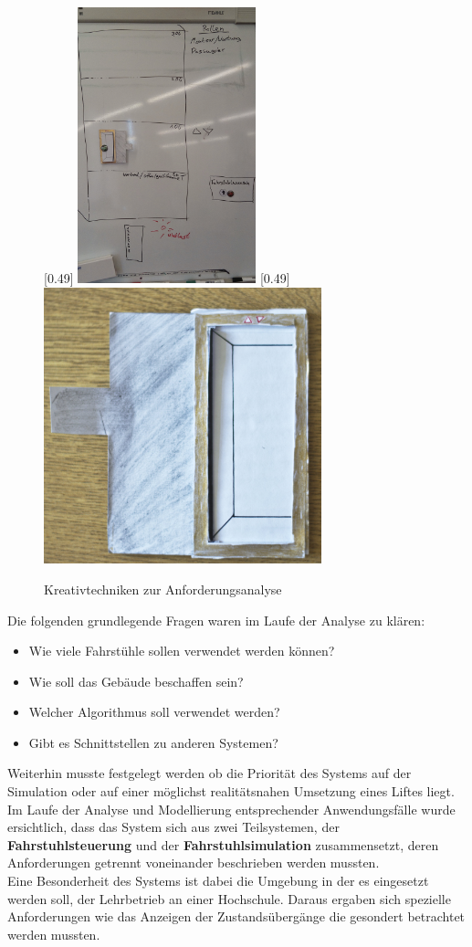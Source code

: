 \begin{figure}[hbt]
\centering
{}[0.49\linewidth]
{\includegraphics[height=8cm]{images/kundengespraech1.jpg}}
[0.49\linewidth]
{\includegraphics[height=8cm]{images/pappfahrstuhl.jpg}}
\caption{Kreativtechniken zur Anforderungsanalyse}
\end{figure}
Die folgenden grundlegende Fragen waren im Laufe der Analyse zu klären:
\begin{itemize}
	\item Wie viele Fahrstühle sollen verwendet werden können?
	\item Wie soll das Gebäude beschaffen sein?
	\item Welcher Algorithmus soll verwendet werden?
	\item Gibt es Schnittstellen zu anderen Systemen?
\end{itemize}
Weiterhin musste festgelegt werden ob die Priorität des Systems auf der Simulation oder auf einer möglichst realitätsnahen Umsetzung eines Liftes liegt. Im Laufe der Analyse und Modellierung entsprechender Anwendungsfälle wurde ersichtlich, dass das System sich aus zwei Teilsystemen, der \textbf{Fahrstuhlsteuerung} und der \textbf{Fahrstuhlsimulation} zusammensetzt, deren Anforderungen getrennt voneinander beschrieben werden mussten.\\
Eine Besonderheit des Systems ist dabei die Umgebung in der es eingesetzt werden soll, der Lehrbetrieb an einer Hochschule. Daraus ergaben sich spezielle Anforderungen wie das Anzeigen der Zustandsübergänge die gesondert betrachtet werden mussten.

